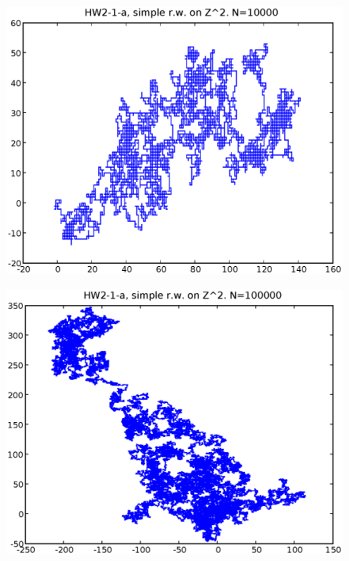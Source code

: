 \documentclass[a4paper,10pt]{article}
\begin{document}
\begin{figure}[p]
\includegraphics[width=1\textwidth]{hw2_1_a_N10000.eps}
\caption{}
\end{figure}
\begin{figure}
\includegraphics[width=1\textwidth]{hw2_1_a_N100000.eps}
\caption{}
\end{figure}
\end{document}
